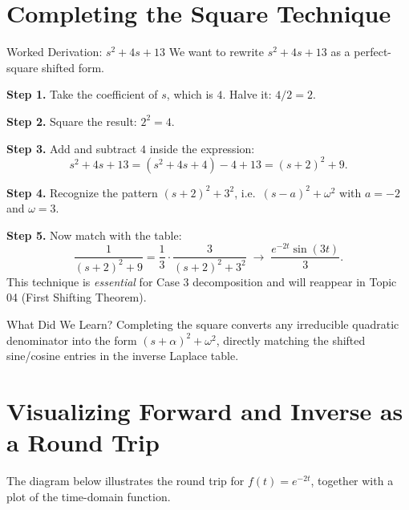 \documentclass[12pt,a4paper]{article}
\begin{document}
\section{Completing the Square Technique}

\begin{infobox}{Worked Derivation: $s^{2}+4s+13$}
We want to rewrite $s^{2}+4s+13$ as a perfect-square shifted form.

\medskip
\noindent\textbf{Step 1.} Take the coefficient of $s$, which is $4$.  Halve it: $4/2 = 2$.

\medskip
\noindent\textbf{Step 2.} Square the result: $2^{2} = 4$.

\medskip
\noindent\textbf{Step 3.} Add and subtract $4$ inside the expression:
\[
    s^{2}+4s+13 = (s^{2}+4s+4) - 4 + 13 = (s+2)^{2} + 9.
\]

\medskip
\noindent\textbf{Step 4.} Recognize the pattern $(s+2)^{2} + 3^{2}$, i.e.\
$(s-a)^{2}+\omega^{2}$ with $a = -2$ and $\omega = 3$.

\medskip
\noindent\textbf{Step 5.} Now match with the table:
\[
    \frac{1}{(s+2)^{2}+9} = \frac{1}{3}\cdot\frac{3}{(s+2)^{2}+3^{2}}
    \;\longrightarrow\; \frac{e^{-2t}\sin(3t)}{3}.
\]
This technique is \emph{essential} for Case 3 decomposition and will reappear in
Topic 04 (First Shifting Theorem).
\end{infobox}

\begin{learnbox}{What Did We Learn?}
Completing the square converts any irreducible quadratic denominator into the
form $(s+\alpha)^{2}+\omega^{2}$, directly matching the shifted sine/cosine
entries in the inverse Laplace table.
\end{learnbox}

\section{Visualizing Forward and Inverse as a Round Trip}

The diagram below illustrates the round trip for $f(t) = e^{-2t}$, together
with a plot of the time-domain function.
\end{document}
